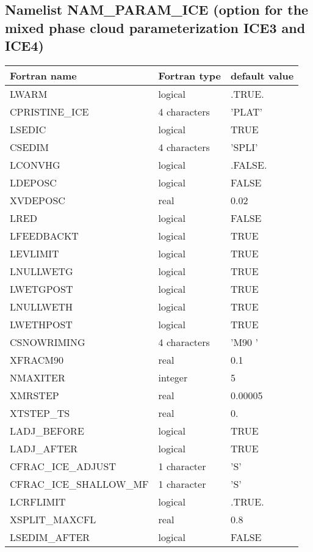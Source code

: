 
\subsection{Namelist NAM\_PARAM\_ICE (option for the mixed phase cloud 
parameterization ICE3 and ICE4)}
%
\begin{center}
\begin{tabular} {|l|l|l|}
\hline
Fortran name & Fortran type & default value \\
\hline
LWARM         &  logical     & .TRUE. \\
CPRISTINE\_ICE & 4 characters & 'PLAT' \\
LSEDIC & logical & TRUE \\
CSEDIM & 4 characters & 'SPLI' \\
LCONVHG       &  logical     & .FALSE. \\
LDEPOSC& logical & FALSE \\
XVDEPOSC& real & 0.02 \\
LRED & logical & FALSE \\
LFEEDBACKT & logical & TRUE \\
LEVLIMIT & logical & TRUE \\
LNULLWETG & logical & TRUE \\
LWETGPOST & logical & TRUE \\
 LNULLWETH & logical & TRUE \\
LWETHPOST & logical & TRUE \\
CSNOWRIMING & 4 characters & 'M90 ' \\
XFRACM90 & real & 0.1 \\
NMAXITER & integer & 5 \\
XMRSTEP & real & 0.00005 \\
XTSTEP\_TS & real & 0. \\
LADJ\_BEFORE & logical & TRUE \\
LADJ\_AFTER & logical & TRUE \\
CFRAC\_ICE\_ADJUST  & 1 character & 'S' \\
CFRAC\_ICE\_SHALLOW\_MF& 1 character & 'S' \\
LCRFLIMIT &  logical     & .TRUE. \\
XSPLIT\_MAXCFL& real & 0.8 \\
LSEDIM\_AFTER & logical & FALSE \\
\hline
\end{tabular}
\end{center}

